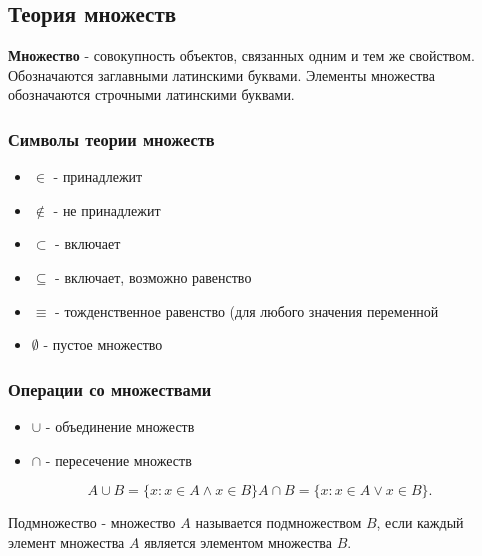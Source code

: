 \subsection{Теория множеств}

\begin{definition}
  \textbf{Множество} - совокупность объектов, связанных одним и тем же свойством. Обозначаются заглавными латинскими буквами. Элементы множества обозначаются строчными латинскими буквами.
\end{definition}

\subsubsection{Символы теории множеств}

\begin{itemize}
  \item $\in$ - принадлежит\\
  \item $\notin$ - не принадлежит\\
  \item $\subset$ - включает\\
  \item $\subseteq$ - включает, возможно равенство\\
  \item $\equiv$ - тожденственное равенство (для любого значения переменной\\
  \item $\emptyset$ - пустое множество
\end{itemize}

\subsubsection{Операции со множествами}

\begin{itemize}
  \item $\cup$ - объединение множеств
  \item $\cap$ - пересечение множеств
\end{itemize}

\begin{note}
   \[
  A\cup B = \{ x : x\in A \land x\in B\} 
  A\cap B = \{x : x\in A \lor x\in B\} 
  .\] 
\end{note}

\begin{definition}
  Подмножество - множество $A$ называется подмножеством  $B$, если каждый элемент множества $A$ является элементом множества $B$.
\end{definition}

